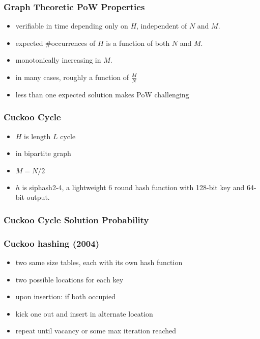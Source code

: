 \documentclass{beamer}
\begin{document}
\begin{frame}
\frametitle{Graph Theoretic PoW Properties}
\begin{itemize}
\item verifiable in time depending only on $H$,
independent of $N$ and $M$.
\item expected \#occurrences of $H$ is a function of both $N$ and $M$.
\item monotonically increasing in $M$.
\item in many cases, roughly a function of $\frac{M}{N}$
\item less than one expected solution makes PoW challenging
\end{itemize}
\end{frame}

\begin{frame}
\frametitle{Cuckoo Cycle}
\begin{itemize}
\item $H$ is length $L$ cycle
\item in bipartite graph
\item $M=N/2$
\item $h$ is siphash2-4, a lightweight 6 round hash function
with 128-bit key and 64-bit output.
\end{itemize}
\end{frame}

\begin{frame}
\frametitle{Cuckoo Cycle Solution Probability}
\end{frame}

\begin{frame}
\frametitle{Cuckoo hashing (2004)}
\begin{itemize}
\item two same size tables, each with its own hash function
\item two possible locations for each key
\item upon insertion: if both occupied
\item kick one out and insert in alternate location
\item repeat until vacancy or some max iteration reached
\end{itemize}
\end{frame}
\end{document}
